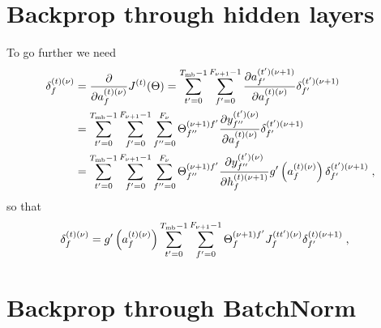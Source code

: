 \begin{subappendices}
\section{Backprop through hidden layers}  \label{sec:appenbplayers}

To go further we need
\begin{align}
\delta^{(t)(\nu)}_f&= \frac{\partial }{\partial  a_{f}^{(t)(\nu)}}J^{(t)}(\Theta)=
%
\sum_{t'=0}^{T_{{\rm mb}}-1}\sum_{f'=0}^{F_{\nu+1}-1}
%
 \frac{\partial  a_{f'}^{(t')(\nu+1)}}{\partial  a_{f}^{(t)(\nu)}} \delta^{(t')(\nu+1)}_{f'}\notag\\
%
&=\sum_{t'=0}^{T_{{\rm mb}}-1}\sum_{f'=0}^{F_{\nu+1}-1}\sum^{F_\nu}_{f''=0}\Theta^{(\nu+1)f'}_{f''}
%
\frac{\partial y^{(t')(\nu)}_{f''} }{\partial  a_{f}^{(t)(\nu)}} \delta^{(t')(\nu+1)}_{f'}\notag\\
%
&=\sum_{t'=0}^{T_{{\rm mb}}-1}\sum_{f'=0}^{F_{\nu+1}-1}\sum^{F_\nu}_{f''=0}\Theta^{(\nu+1)f'}_{f''}
%
\frac{\partial y^{(t')(\nu)}_{f''} }{\partial  h_{f}^{(t)(\nu+1)}}
%
g'\left(a_{f}^{(t)(\nu)}\right) \delta^{(t')(\nu+1)}_{f'}\;,
\end{align}
so that
\begin{align}
\delta^{(t)(\nu)}_f&=g'\left(a_{f}^{(t)(\nu)}\right)
%
\sum_{t'=0}^{T_{{\rm mb}}-1}\sum_{f'=0}^{F_{\nu+1}-1}\Theta^{(\nu+1)f'}_{f}J^{(tt')(\nu)}_{f} \delta^{(t)(\nu+1)}_{f'}\;,
\end{align}


\section{Backprop through BatchNorm} \label{sec:appenbatchnorm}



\end{subappendices}
